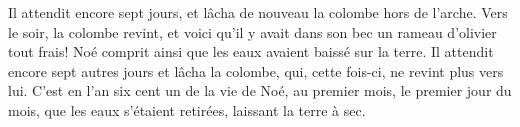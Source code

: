 Il attendit encore sept jours, et lâcha de nouveau la colombe hors de l’arche.
Vers le soir, la colombe revint,
	et voici qu’il y avait dans son bec un rameau d’olivier tout frais!
	Noé comprit ainsi que les eaux avaient baissé sur la terre.
Il attendit encore sept autres jours et lâcha la colombe,
	qui, cette fois-ci, ne revint plus vers lui.
C’est en l’an six cent un de la vie de Noé,
	au premier mois, le premier jour du mois,
	que les eaux s’étaient retirées, laissant la terre à sec.
